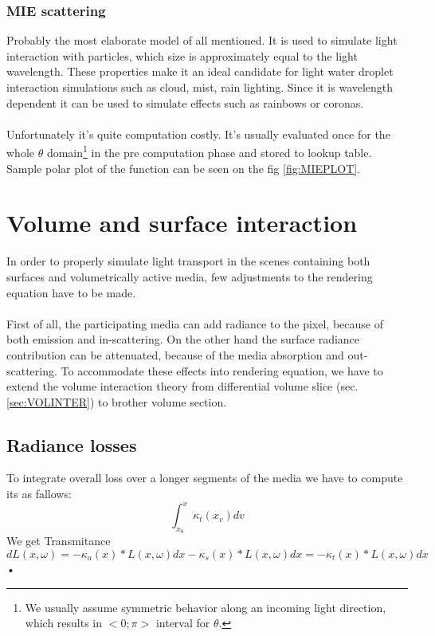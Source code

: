 \subsubsection{MIE scattering}
\label{lab:MIE}
Probably the most elaborate model of all mentioned. It is used to simulate light interaction with particles, which size is approximately equal to the light wavelength. These properties make it an ideal candidate for light water droplet interaction simulations such as cloud, mist, rain lighting. Since it is wavelength dependent it can be used to simulate effects such as rainbows or coronas.
\\
\\
Unfortunately it's quite computation costly. It's usually evaluated once for the whole $\theta$ domain\footnote{We usually assume symmetric behavior along an incoming light direction, which results in $<0;\pi>$ interval for $\theta$.} in the pre computation phase and stored to lookup table. Sample polar plot of the function can be seen on the fig \ref{fig:MIEPLOT}.


\clearpage{}
\section{Volume and surface interaction}
\label{sec:EXTREND}
In order to properly simulate light transport in the scenes containing both surfaces and volumetrically active media, few adjustments to the rendering equation have to be made.
\\
\\
First of all, the participating media can add radiance to the pixel, because of both emission and in-scattering. On the other hand the surface radiance contribution can be attenuated, because of the media absorption and out-scattering. To accommodate these effects into rendering equation, we have to extend the volume interaction theory  from differential volume slice (sec. \ref{sec:VOLINTER}) to brother volume section.

\subsection{Radiance losses}
To integrate overall loss over a longer segments of the media we have to compute its  as fallows:
\begin{equation}
 	\int_{x_{0}}^{x}\kappa_t(x_{v})dv
 \end{equation}
We get Transmitance
\begin{equation}
\label{eq:EXTRANS}
dL(x,\omega)=-\kappa_a(x)*L(x,\omega)dx-\kappa_s(x)*L(x,\omega)dx =-\kappa_t(x)*L(x,\omega)dx
\end{equation}•

